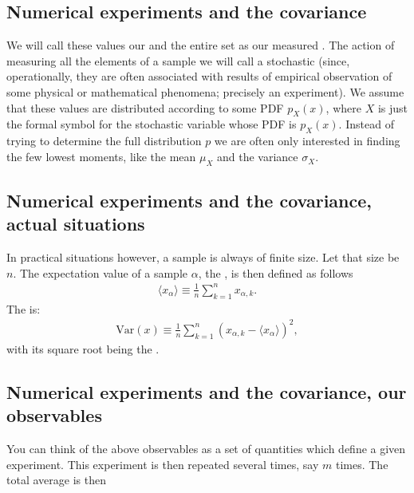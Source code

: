 \documentclass[letterpaper,10pt,english]{sphinxmanual}
\begin{document}
\subsection{Numerical experiments and the covariance}
\label{\detokenize{chapter3:id4}}
We will call these
values our  and the entire set as our measured
.  The action of measuring all the elements of a sample
we will call a stochastic  (since, operationally,
they are often associated with results of empirical observation of
some physical or mathematical phenomena; precisely an experiment). We
assume that these values are distributed according to some
PDF \(p_X^{\phantom X}(x)\), where \(X\) is just the formal symbol for the
stochastic variable whose PDF is \(p_X^{\phantom X}(x)\). Instead of
trying to determine the full distribution \(p\) we are often only
interested in finding the few lowest moments, like the mean
\(\mu_X^{\phantom X}\) and the variance \(\sigma_X^{\phantom X}\).


\subsection{Numerical experiments and the covariance, actual situations}
\label{\detokenize{chapter3:numerical-experiments-and-the-covariance-actual-situations}}
In practical situations however, a sample is always of finite size. Let that
size be \(n\). The expectation value of a sample \(\alpha\), the , is then defined as follows
\begin{equation*}
\begin{split}
\langle x_{\alpha} \rangle \equiv \frac{1}{n}\sum_{k=1}^n x_{\alpha,k}.
\end{split}
\end{equation*}
The  is:
\begin{equation*}
\begin{split}
\mathrm{Var}(x) \equiv \frac{1}{n}\sum_{k=1}^n (x_{\alpha,k} - \langle x_{\alpha} \rangle)^2,
\end{split}
\end{equation*}
with its square root being the .


\subsection{Numerical experiments and the covariance, our observables}
\label{\detokenize{chapter3:numerical-experiments-and-the-covariance-our-observables}}
You can think of the above observables as a set of quantities which define
a given experiment. This experiment is then repeated several times, say \(m\) times.
The total average is then
\end{document}
